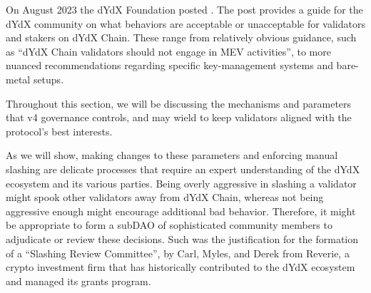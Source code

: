     On August 2023 the dYdX Foundation posted . The post provides a guide for the dYdX community on what behaviors are acceptable or unacceptable for validators and stakers on dYdX Chain. These range from relatively obvious guidance, such as ``dYdX Chain validators should not engage in MEV activities'', to more nuanced recommendations regarding specific key-management systems and bare-metal setups. 

    Throughout this section, we will be discussing the mechanisms and parameters that v4 governance controls, and may wield to keep validators aligned with the protocol's best interests. 
    
    As we will show, making changes to these parameters and enforcing manual slashing are delicate processes that require an expert understanding of the dYdX ecosystem and its various parties. Being overly aggressive in slashing a validator might spook other validators away from dYdX Chain, whereas not being aggressive enough might encourage additional bad behavior. Therefore, it might be appropriate to form a subDAO of sophisticated community members to adjudicate or review these decisions. Such was the justification for the formation of a ``Slashing Review Committee'',  by Carl, Myles, and Derek from Reverie, a crypto investment firm that has historically contributed to the dYdX ecosystem and managed its grants program.

